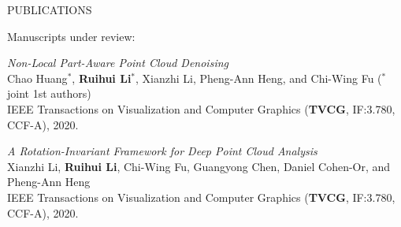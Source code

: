 \documentclass[UTF8]{cv} %
\begin{document}
\begin{rSection}{PUBLICATIONS}


\hspace{-7mm} Manuscripts under review:
\begin{etaremune}[itemindent=0.00em]
    \renewcommand\labelenumi{[M\theenumi]}
    \item  \emph{Non-Local Part-Aware Point Cloud Denoising}
\\    Chao Huang$^*$, \textbf{Ruihui Li}$^*$, Xianzhi Li, Pheng-Ann Heng, and Chi-Wing Fu ($^*$joint 1st authors)
\\    IEEE Transactions on Visualization and Computer Graphics  (\textbf{TVCG}, IF:3.780, CCF-A), 2020.
    \item  \emph{A Rotation-Invariant Framework for Deep Point Cloud Analysis}
\\    Xianzhi Li, \textbf{Ruihui Li}, Chi-Wing Fu, Guangyong Chen, Daniel Cohen-Or, and Pheng-Ann Heng
\\    IEEE Transactions on Visualization and Computer Graphics  (\textbf{TVCG}, IF:3.780, CCF-A), 2020.
\end{etaremune}

\vspace{2cm}

\end{rSection}
\end{document}
